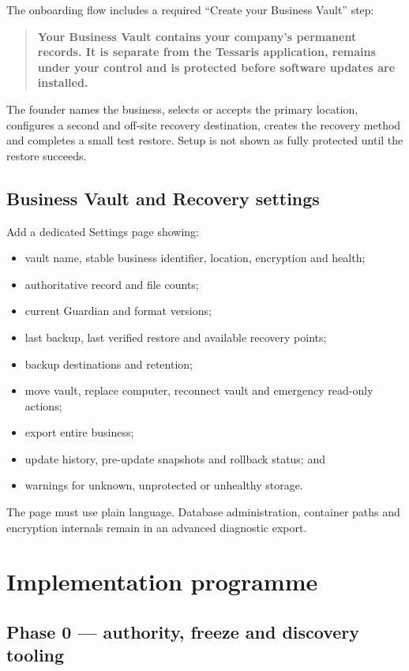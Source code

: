 \documentclass[11pt]{article}
\begin{document}
The onboarding flow includes a required ``Create your Business Vault'' step:

\begin{quote}
\textbf{Your Business Vault contains your company's permanent records. It is separate from the Tessaris application, remains under your control and is protected before software updates are installed.}
\end{quote}

The founder names the business, selects or accepts the primary location, configures a second and off-site recovery destination, creates the recovery method and completes a small test restore. Setup is not shown as fully protected until the restore succeeds.

\subsection{Business Vault and Recovery settings}

Add a dedicated Settings page showing:

\begin{itemize}
  \item vault name, stable business identifier, location, encryption and health;
  \item authoritative record and file counts;
  \item current Guardian and format versions;
  \item last backup, last verified restore and available recovery points;
  \item backup destinations and retention;
  \item move vault, replace computer, reconnect vault and emergency read-only actions;
  \item export entire business;
  \item update history, pre-update snapshots and rollback status; and
  \item warnings for unknown, unprotected or unhealthy storage.
\end{itemize}

The page must use plain language. Database administration, container paths and encryption internals remain in an advanced diagnostic export.

\section{Implementation programme}

\subsection{Phase 0 --- authority, freeze and discovery tooling}
\end{document}
